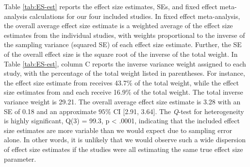 \documentclass[
]{book}
\begin{document}
Table \ref{tab:ES-est} reports the effect size estimates, SEs, and fixed effect meta-analysis calculations for our four included studies. In fixed effect meta-analysis, the overall average effect size estimate is a weighted average of the effect size estimates from the individual studies, with weights proportional to the inverse of the sampling variance (squared SE) of each effect size estimate. Further, the SE of the overall effect size is the square root of the inverse of the total weight. In Table \ref{tab:ES-est}, column C reports the inverse variance weight assigned to each study, with the percentage of the total weight listed in parentheses. For instance, the effect size estimate from \citet{peltier2020Effects} receives 43.7\% of the total weight, while the effect size estimates from \citet{case1992Improving} and \citet{hutchinson1993Effects} each receive 16.9\% of the total weight. The total inverse variance weight is 29.21. The overall average effect size estimate is 3.28 with an SE of 0.18 and an approximate \(95\%\) CI {[}2.91, 3.64{]}. The \emph{Q}-test for heterogeneity is highly significant, Q(3) = 99.3, p \textless{} .0001, indicating that the included effect size estimates are more variable than we would expect due to sampling error alone. In other words, it is unlikely that we would observe such a wide dispersion of effect size estimates if the studies were all estimating the same true effect size parameter.

\begin{table}

\caption{\label{tab:ES-est}Fixed Effect Meta-Analysis Calculations for 
             Example Math Invervention Studies}
\centering
{}
\end{table}
\end{document}

